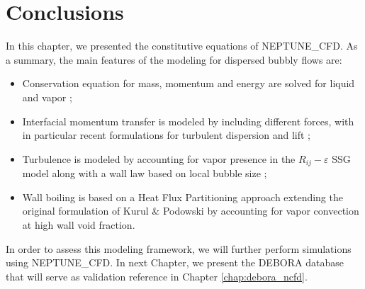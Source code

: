 \section{Conclusions}

In this chapter, we presented the constitutive equations of NEPTUNE\_CFD. As a summary, the main features of the modeling for dispersed bubbly flows are:

\begin{itemize}
\item Conservation equation for mass, momentum and energy are solved for liquid and vapor ;
\item Interfacial momentum transfer is modeled by including different forces, with in particular recent formulations for turbulent dispersion and lift ;
\item Turbulence is modeled by accounting for vapor presence in the $R_{ij}-\varepsilon$ SSG model along with a wall law based on local bubble size ;
\item Wall boiling is based on a Heat Flux Partitioning approach extending the original formulation of Kurul \& Podowski \cite{kurul_multidimensional_1990} by accounting for vapor convection at high wall void fraction.
\end{itemize}

In order to assess this modeling framework, we will further perform simulations using NEPTUNE\_CFD. In next Chapter, we present the DEBORA database that will serve as validation reference in Chapter \ref{chap:debora_ncfd}.


%
